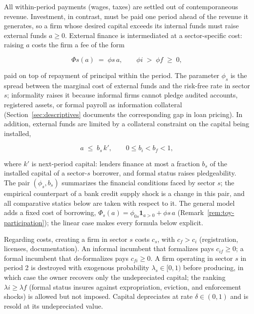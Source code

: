 \documentclass[12pt]{article}
\begin{document}
All within-period payments (wages, taxes) are settled out of contemporaneous revenue. Investment, in contrast, must be paid one period ahead of the revenue it generates, so a firm whose desired capital exceeds its internal funds must raise external funds $a\geq0$. External finance is intermediated at a sector-specific cost: raising $a$ costs the firm a fee of the form

\begin{equation}
  \Phi{s}(a) \;=\; \phi{s}\,a , \qquad
  \phi{i} \;>\; \phi{f}\;\geq\;0 ,
  \label{eq:toy-fincost}
\end{equation}

paid on top of repayment of principal within the period. The parameter $\phi_{s}$ is the spread between the marginal cost of external funds and the risk-free rate in sector $s$; informality raises it because informal firms cannot pledge audited accounts, registered assets, or formal payroll as information collateral (Section~\ref{sec:descriptives} documents the corresponding gap in loan pricing). In addition, external funds are limited by a collateral constraint on the capital being installed,

\begin{equation}
  a \;\leq\; b_{s}\,k' , \qquad 0\leq b_{i} <
  b_{f} < 1 ,
  \label{eq:toy-collateral}
\end{equation} 

where $k'$ is next-period capital: lenders finance at most a fraction $b_{s}$ of the installed capital of a sector-$s$ borrower, and formal status raises pledgeability. The pair $(\phi_{s},b_{s})$ summarizes the financial conditions faced by sector $s$; the empirical counterpart of a bank credit supply shock is a change in this pair, and all comparative statics below are taken with respect to it. The general model adds a fixed cost of borrowing, $\Phi_{s}(a)=\phi_{0s}\mathbf{1}_{a>0}+\phi{s}\,a$ (Remark~\ref{rem:toy-participation}); the linear case makes every formula below explicit.
 
Regarding costs, creating a firm in sector $s$ costs $c_{s}$, with $c_{f}>c_{i}$ (registration, licenses, documentation). An informal incumbent that formalizes pays $c_{if}\geq0$; a formal incumbent that de-formalizes pays $c_{fi}\geq0$. A firm operating in sector $s$ in period 2 is destroyed with exogenous probability $\lambda_{s}\in[0,1)$ before producing, in which case the owner recovers only the undepreciated capital; the ranking $\lambda{i}\geq\lambda{f}$ (formal status insures against expropriation, eviction, and enforcement shocks) is allowed but not imposed. Capital depreciates at rate $\delta\in(0,1)$ and is resold at its undepreciated value.
\end{document}
